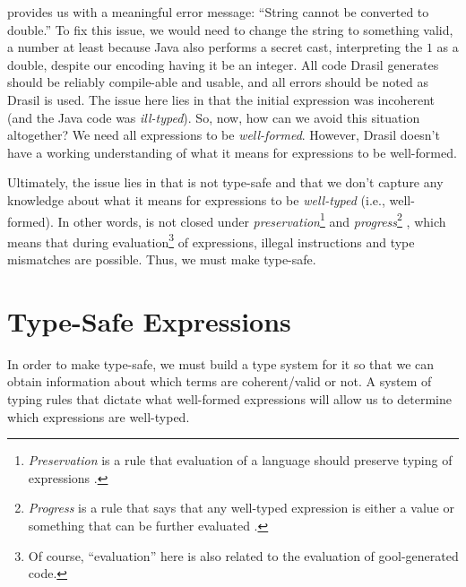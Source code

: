 \pseudoExampleLandPosQDBadTypingJavaCode{}

\pseudoExampleLandPosQDBadTypingJavaCodeCompErr{}

 provides us with a
meaningful error message: ``String cannot be converted to double.'' To fix this
issue, we would need to change the string to something valid, a number at least
because Java also performs a secret cast, interpreting the \(1\) as a double,
despite our encoding having it be an integer. All code Drasil generates should
be reliably compile-able and usable, and all errors should be noted as Drasil is
used. The issue here lies in that the initial expression was incoherent (and the
Java code was \textit{ill-typed}). So, now, how can we avoid this situation
altogether? We need all expressions to be \textit{well-formed}. However, Drasil
doesn't have a working understanding of what it means for expressions to be
well-formed.

Ultimately, the issue lies in that \Expr{} is not type-safe \cite{Harper2016}
and that we don't capture any knowledge about what it means for expressions to
be \textit{well-typed} (i.e., well-formed). In other words, \Expr{} is not
closed under \textit{preservation}\footnote{\textit{Preservation} is a rule that
evaluation of a language should preserve typing of expressions
\cite{Harper2016}.} and \textit{progress}\footnote{\textit{Progress} is a rule
that says that any well-typed expression is either a value or something that can
be further evaluated \cite{Harper2016}.} \cite{Harper2016}, which means that
during evaluation\footnote{Of course, ``evaluation'' here is also related to the
evaluation of \acs{gool}-generated code.} of expressions, illegal instructions
and type mismatches are possible. Thus, we must make \Expr{} type-safe.

\section{Type-Safe Expressions}
\label{chap:typed-expr:sec:type-safe-expressions}

In order to make \Expr{} type-safe, we must build a type system for it so that
we can obtain information about which \Expr{} terms are coherent/valid or not. A
system of typing rules that dictate what well-formed expressions will allow us
to determine which expressions are well-typed.


